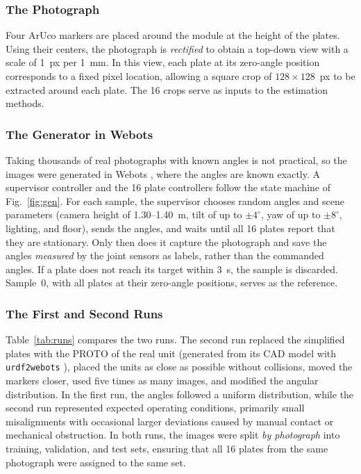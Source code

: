 \documentclass[lettersize,journal]{IEEEtran}
\begin{document}
	\subsubsection{The Photograph}
	
	Four ArUco markers \cite{aruco} are placed around the module at the height of the plates. Using their centers, the photograph is \emph{rectified} to obtain a top-down view with a scale of 1~px per 1~mm. In this view, each plate at its zero-angle position corresponds to a fixed pixel location, allowing a square crop of $128\times128$~px to be extracted around each plate. The 16 crops serve as inputs to the estimation methods.
	
	\vspace{1.5ex}
	\subsubsection{The Generator in Webots}
	
	Taking thousands of real photographs with known angles is not practical, so the images were generated in Webots \cite{webots}, where the angles are known exactly. A supervisor controller and the 16 plate controllers follow the state machine of Fig.~\ref{fig:gen}. For each sample, the supervisor chooses random angles and scene parameters (camera height of 1.30--1.40~m, tilt of up to $\pm4^\circ$, yaw of up to $\pm8^\circ$, lighting, and floor), sends the angles, and waits until all 16 plates report that they are stationary. Only then does it capture the photograph and save the angles \emph{measured} by the joint sensors as labels, rather than the commanded angles. If a plate does not reach its target within 3~s, the sample is discarded. Sample~0, with all plates at their zero-angle positions, serves as the reference.

	\vspace{1.5ex}
	\subsubsection{The First and Second Runs}
	
	Table~\ref{tab:runs} compares the two runs. The second run replaced the simplified plates with the PROTO of the real unit (generated from its CAD model with \texttt{urdf2webots} \cite{urdf2webots}), placed the units as close as possible without collisions, moved the markers closer, used five times as many images, and modified the angular distribution. In the first run, the angles followed a uniform distribution, while the second run represented expected operating conditions, primarily small misalignments with occasional larger deviations caused by manual contact or mechanical obstruction. In both runs, the images were split \emph{by photograph} into training, validation, and test sets, ensuring that all 16 plates from the same photograph were assigned to the same set.
\end{document}
